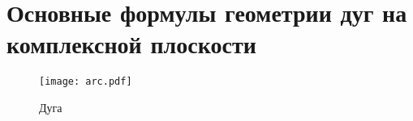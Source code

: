 
\chapter{%
  Основные формулы геометрии дуг на комплексной плоскости
}
\label{app:bulge}


\begin{figure}
  \centering
  \texttt{[image: arc.pdf]}
  \caption{Дуга}
  \label{fig:app.arc}
\end{figure}
